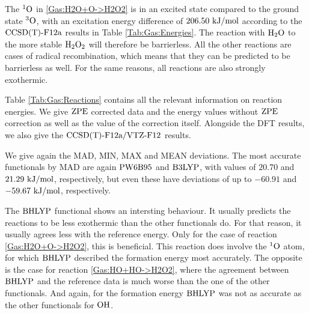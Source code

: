 
The ${^1\text{O}}$ in \eqref{Gas:H2O+O->H2O2} is in an excited state
compared to the ground state ${^3\text{O}}$, with an excitation energy difference
of $206.50~\text {kJ/mol}$ according to the $\text{CCSD(T)-F12a}$ results in Table
\ref{Tab:Gas:Energies}. The reaction with $\text H _2 \text O$ to the more stable
$\text H _2 \text O_2$ will therefore be barrierless. All the other reactions are cases of
radical recombination, which means that they can be predicted to be barrierless
as well. For the same reasons, all reactions are also strongly exothermic.

Table \ref{Tab:Gas:Reactions} contains all the relevant information on
reaction energies. We give $\text{ZPE}$ corrected data and the energy
values without $\text{ZPE}$ correction as well as the value of the correction
itself. Alongside the DFT results, we also give the $\text{CCSD(T)-F12a}/\text{VTZ-F}12$ results.

We give again the MAD, MIN, MAX and MEAN deviations.
The most accurate functionals by MAD are again $\text{PW6B95}$
and $\text{B3LYP}$, with values of $20.70$ and $21.29~\text {kJ/mol}$, respectively,
but even these have deviations of up to $-60.91$ and $-59.67~\text {kJ/mol}$,
respectively.

The $\text{BHLYP}$ functional shows an intersting behaviour. It usually
predicts the reactions to be less exothermic than the other
functionals do.
For that reason, it usually agrees less with the reference energy.
Only for the case of reaction \eqref{Gas:H2O+O->H2O2}, this is beneficial. This
reaction does involve the ${^1\text{O}}$ atom, for which $\text{BHLYP}$ described the
formation energy most accurately. The opposite is the case for reaction
\eqref{Gas:HO+HO->H2O2}, where the agreement between $\text{BHLYP}$ and the reference
data is much worse than the one of the other functionals. And again, for the
formation energy $\text{BHLYP}$ was not as accurate as the other functionals for
$\text O \text H$.

